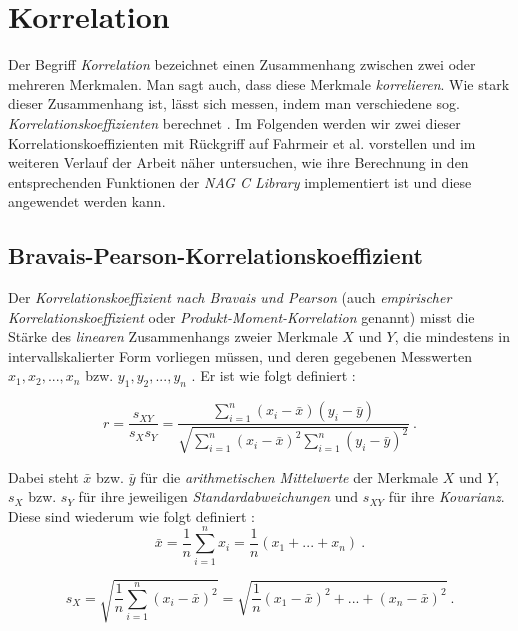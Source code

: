 \section{Korrelation}
\label{sec:korrelation}

Der Begriff {\it Korrelation} bezeichnet einen Zusammenhang zwischen zwei oder mehreren Merkmalen. Man sagt auch, dass diese Merkmale {\it korrelieren}. Wie stark dieser Zusammenhang ist, lässt sich messen, indem man verschiedene sog. {\it Korrelationskoeffizienten} berechnet \cite[S. 135]{Fahrmeir2010}. Im Folgenden werden wir zwei dieser Korrelationskoeffizienten mit Rückgriff auf Fahrmeir et al. \cite{Fahrmeir2010} vorstellen und im weiteren Verlauf der Arbeit näher untersuchen, wie ihre Berechnung in den entsprechenden Funktionen der {\it NAG C Library} implementiert ist und diese angewendet werden kann.

\subsection{Bravais-Pearson-Korrelationskoeffizient}
\label{sec:brav_pear_korr}

Der {\it Korrelationskoeffizient nach Bravais und Pearson} (auch {\it empirischer Korrelationskoeffizient} oder {\it Produkt-Moment-Korrelation} genannt) misst die Stärke des {\it linearen} Zusammenhangs zweier Merkmale $X$ und $Y$, die mindestens in intervallskalierter Form vorliegen müssen, und deren gegebenen Messwerten $x_1,x_2,...,x_n$ bzw. $y_1,y_2,...,y_n$ . Er ist wie folgt definiert \cite[S. 136]{Fahrmeir2010}:

\begin{equation*}
	r=\dfrac{s_{XY}}{s_Xs_Y}=\dfrac{\sum_{i=1}^{n}{(x_i-\bar{x})(y_i-\bar{y})}}{\sqrt{\sum_{i=1}^{n}{(x_i-\bar{x})^2\sum_{i=1}^{n}{(y_i-\bar{y})^2}}}} ~.
\end{equation*}

\noindent Dabei steht $\bar{x}$ bzw. $\bar{y}$ für die {\it arithmetischen Mittelwerte} der Merkmale $X$ und $Y$, $s_{X}$ bzw. $s_{Y}$ für ihre jeweiligen {\it Standardabweichungen} und $s_{XY}$ für ihre {\it Kovarianz}. Diese sind wiederum wie folgt definiert \cite[S. 136]{Fahrmeir2010}:\\

\begin{equation*}
	\bar{x}=\dfrac{1}{n}\sum_{i=1}^{n}{x_i}=\dfrac{1}{n}(x_1+...+x_n) ~.
\end{equation*}

\begin{equation*}
	s_X=\sqrt{\dfrac{1}{n}\sum_{i=1}^{n}{(x_i-\bar{x})^2}}=\sqrt{\dfrac{1}{n}(x_1-\bar{x})^2+...+(x_n-\bar{x})^2} ~.
\end{equation*}

